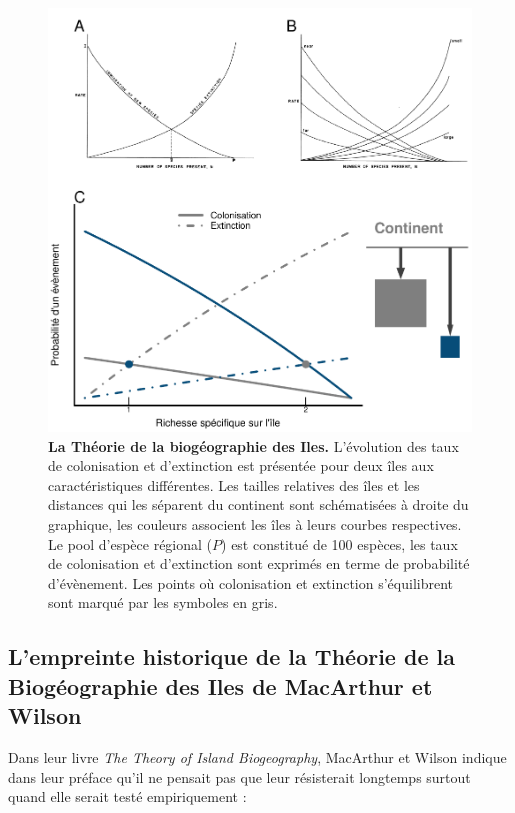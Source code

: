 \begin{figure}[htbp]
\centering
\includegraphics{fig/fig1.pdf}
\caption{\textbf{La Théorie de la biogéographie des Iles.} L'évolution
des taux de colonisation et d'extinction est présentée pour deux îles
aux caractéristiques différentes. Les tailles relatives des îles et les
distances qui les séparent du continent sont schématisées à droite du
graphique, les couleurs associent les îles à leurs courbes respectives.
Le pool d'espèce régional (\(P\)) est constitué de 100 espèces, les taux
de colonisation et d'extinction sont exprimés en terme de probabilité
d'évènement. Les points où colonisation et extinction s'équilibrent sont
marqué par les symboles en gris.\label{fig:figMW}}
\end{figure}

\subsection*{L'empreinte historique de la Théorie de la Biogéographie
des Iles de MacArthur et
Wilson}\label{lempreinte-historique-de-la-thuxe9orie-de-la-bioguxe9ographie-des-iles-de-macarthur-et-wilson}

Dans leur livre \emph{The Theory of Island Biogeography}, MacArthur et
Wilson indique dans leur préface qu'il ne pensait pas que leur
résisterait longtemps surtout quand elle serait testé empiriquement :

